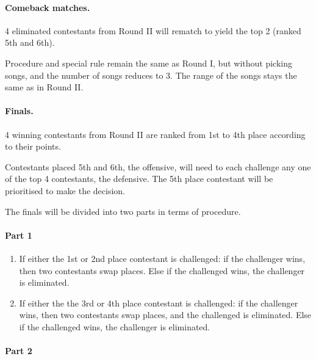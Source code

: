 \documentclass{article}
\newcommand{\srbgcolor}{red!40}
\begin{document}
\paragraph{Comeback matches.}
4 eliminated contestants
from Round II will rematch to yield the top 2
(ranked 5th and 6th).

Procedure and \colorbox{\srbgcolor}{special rule} remain the same as Round I,
but without picking songs,
and the number of songs reduces to 3.
The range of the songs stays the same as in Round II.

\paragraph{Finals.}
4 winning contestants from Round II
are ranked from 1st to 4th place
according to their points.

Contestants placed 5th and 6th, the offensive,
will need to each challenge any
one of the top 4 contestants, the defensive.
The 5th place contestant will be prioritised to make the decision.

The finals will be divided into two parts in terms of procedure.

\paragraph{Part 1}

\begin{enumerate}
	\item  If either the 1st or 2nd place contestant is challenged:
	      if the challenger wins,
	      then two contestants swap places.
	      Else if the challenged wins, the challenger is eliminated.

	\item  If either the the 3rd or 4th place contestant is challenged:
	      if the challenger wins,
	      then two contestants swap places,
	      and the challenged is eliminated.
	      Else if the challenged wins, the challenger is eliminated.
\end{enumerate}

\paragraph{Part 2}
\end{document}
